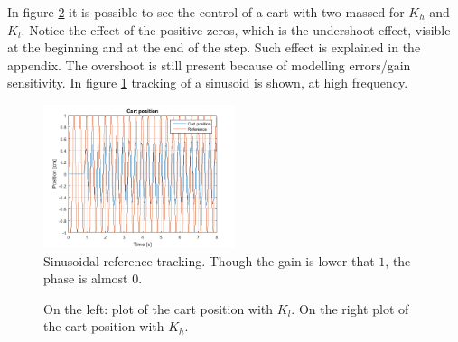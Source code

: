 In figure \ref{fig:possrhp} it is possible to see the control of a cart with two massed for $K_h$ and $K_l$. Notice the effect of the positive zeros, which is the undershoot effect, visible at the beginning and at the end of the step. Such effect is explained in the appendix. The overshoot is still present because of modelling errors/gain sensitivity. In figure \ref{fig:rhpsin} tracking of a sinusoid is shown, at high frequency.
\begin{figure}[h]
\centering
\includegraphics[width=0.5\textwidth]{img/pos_zeros_sin.png}
\caption{Sinusoidal reference tracking. Though the gain is lower that $1$, the phase is almost $0$.}
\label{fig:rhpsin}
\end{figure}


  \begin{figure}[!tbh]
  \centering
  \hfill
  \caption{On the left: plot of the cart position with  $K_l$. On the right plot of the cart position with $K_h$.}
    \label{fig:possrhp}
\end{figure}